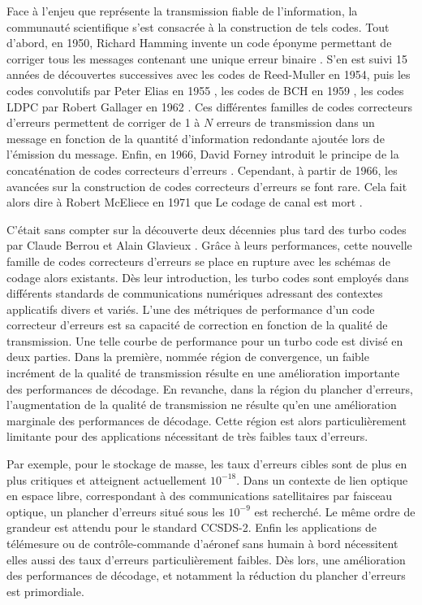 Face à l'enjeu que représente la transmission fiable de l'information, la communauté scientifique s'est consacrée à la 
construction de tels codes. Tout d'abord, en 1950, Richard Hamming invente un code éponyme permettant de corriger tous 
les messages contenant une unique erreur binaire \cite{hamming}. S'en est suivi 15 années de découvertes successives avec les codes de Reed-Muller \cite{reedmuller1,reedmuller2} en 1954,
puis les codes convolutifs par Peter Elias en 1955 \cite{elias}, les codes de BCH en 1959 \cite{hocquenghem1959codes,bose1960class}, les codes LDPC par Robert Gallager en 1962 \cite{gallager1962low}.
Ces différentes familles de codes correcteurs d'erreurs permettent de corriger de 1 à $N$ erreurs de transmission dans un message en fonction de la quantité d'information redondante ajoutée lors de l'émission du message.
Enfin, en 1966, David Forney introduit le principe de la concaténation de codes correcteurs d'erreurs \cite{forney1966concatenated}. Cependant, à partir de 1966, les avancées
sur la construction de codes correcteurs d'erreurs se font rare. Cela fait alors dire à Robert McEliece en 1971 que 
\og Le codage de canal est mort \fg\cite{codingdead}. 

C'était sans compter sur la découverte deux décennies plus tard des turbo codes par Claude Berrou et Alain Glavieux \cite{berrouTC}. 
Grâce à leurs performances, cette nouvelle famille de codes correcteurs d'erreurs se place en rupture avec les
schémas de codage alors existants. Dès leur introduction, les turbo codes sont employés dans différents 
standards de communications numériques adressant des contextes applicatifs divers et variés. L'une des métriques de 
performance d'un code correcteur d'erreurs est sa capacité de correction en fonction de la qualité de transmission. 
Une telle courbe de performance pour un turbo code est divisé en deux parties. Dans la première, nommée région de 
convergence, un faible incrément de la qualité de transmission résulte en une amélioration importante des performances de
décodage. En revanche, dans la région du plancher d'erreurs, l'augmentation de la qualité de transmission ne résulte qu'en
une amélioration marginale des performances de décodage. Cette région est alors particulièrement limitante pour des applications
nécessitant de très faibles taux d'erreurs.

Par exemple, 
pour le stockage de masse, les taux d'erreurs cibles sont de plus en plus critiques et atteignent actuellement $10^{-18}$.
Dans un contexte de 
lien optique en espace libre, correspondant à des communications satellitaires par faisceau optique, un 
plancher d'erreurs situé sous les $10^{-9}$ est recherché. Le même ordre de grandeur est attendu pour le standard 
CCSDS-2. Enfin les applications de télémesure ou de 
contrôle-commande d'aéronef sans humain à bord nécessitent elles aussi des taux d'erreurs particulièrement faibles. Dès 
lors, une amélioration des performances de décodage, et notamment la réduction du plancher d'erreurs est primordiale.

